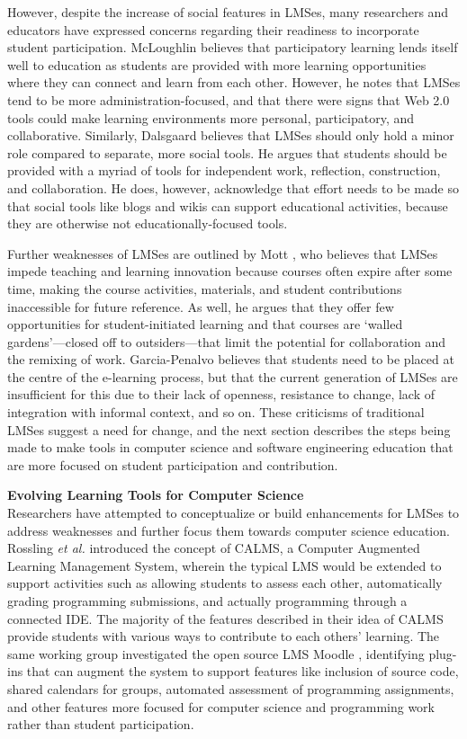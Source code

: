 However, despite the increase of social features in LMSes, many researchers and educators have expressed concerns regarding their readiness to incorporate student participation. McLoughlin \cite{mcloughlin2007social} believes that participatory learning lends itself well to education as students are provided with more learning opportunities where they can connect and learn from each other. However, he notes that LMSes tend to be more administration-focused, and that there were signs that Web 2.0 tools could make learning environments more personal, participatory, and collaborative. Similarly, Dalsgaard \cite{dalsgaard2006social} believes that LMSes should only hold a minor role compared to separate, more social tools. He argues that students should be provided with a myriad of tools for independent work, reflection, construction, and collaboration. He does, however, acknowledge that effort needs to be made so that social tools like blogs and wikis can support educational activities, because they are otherwise not educationally-focused tools.

Further weaknesses of LMSes are outlined by Mott \cite{mott2010envisioning}, who believes that LMSes impede teaching and learning innovation because courses often expire after some time, making the course activities, materials, and student contributions inaccessible for future reference. As well, he argues that they offer few opportunities for student-initiated learning and that courses are `walled gardens'---closed off to outsiders---that limit the potential for collaboration and the remixing of work. Garcia-Penalvo \cite{garcia2011opening} believes that students need to be placed at the centre of the e-learning process, but that the current generation of LMSes are insufficient for this due to their lack of openness, resistance to change, lack of integration with informal context, and so on. These criticisms of traditional LMSes suggest a need for change, and the next section describes the steps being made to make tools in computer science and software engineering education that are more focused on student participation and contribution.

\textbf{Evolving Learning Tools for Computer Science} \\
Researchers have attempted to conceptualize or build enhancements for LMSes to address weaknesses and further focus them towards computer science education. Rossling \textit{et al.} \cite{rossling2008enhancing} introduced the concept of CALMS, a Computer Augmented Learning Management System, wherein the typical LMS would be extended to support activities such as allowing students to assess each other, automatically grading programming submissions, and actually programming through a connected IDE. The majority of the features described in their idea of CALMS provide students with various ways to contribute to each others' learning. The same working group investigated the open source LMS Moodle \cite{rossling2010adapting}, identifying plug-ins that can augment the system to support features like inclusion of source code, shared calendars for groups, automated assessment of programming assignments, and other features more focused for computer science and programming work rather than student participation.

